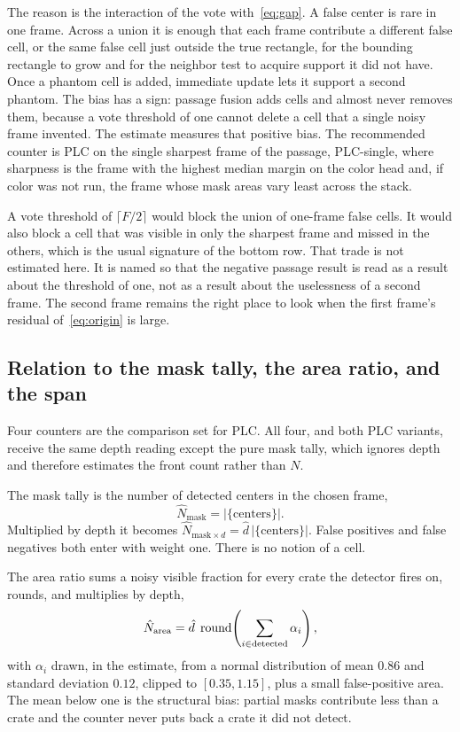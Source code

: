 The reason is the interaction of the vote with~\eqref{eq:gap}. A false center is rare in one frame. Across a union it is enough that each frame contribute a different false cell, or the same false cell just outside the true rectangle, for the bounding rectangle to grow and for the neighbor test to acquire support it did not have. Once a phantom cell is added, immediate update lets it support a second phantom. The bias has a sign: passage fusion adds cells and almost never removes them, because a vote threshold of one cannot delete a cell that a single noisy frame invented. The estimate measures that positive bias. The recommended counter is PLC on the single sharpest frame of the passage, PLC-single, where sharpness is the frame with the highest median margin on the color head and, if color was not run, the frame whose mask areas vary least across the stack.

A vote threshold of $\lceil F/2\rceil$ would block the union of one-frame false cells. It would also block a cell that was visible in only the sharpest frame and missed in the others, which is the usual signature of the bottom row. That trade is not estimated here. It is named so that the negative passage result is read as a result about the threshold of one, not as a result about the uselessness of a second frame. The second frame remains the right place to look when the first frame's residual of~\eqref{eq:origin} is large.

\subsection{Relation to the mask tally, the area ratio, and the span}
\label{sec:plc-baselines}

Four counters are the comparison set for PLC. All four, and both PLC variants, receive the same depth reading except the pure mask tally, which ignores depth and therefore estimates the front count rather than $N$.

The mask tally is the number of detected centers in the chosen frame,
\begin{equation}
\hat{N}_{\text{mask}} = \lvert\{\text{centers}\}\rvert.
\label{eq:mask-count}
\end{equation}
Multiplied by depth it becomes $\hat{N}_{\text{mask}\times d}=\hat{d}\,\lvert\{\text{centers}\}\rvert$. False positives and false negatives both enter with weight one. There is no notion of a cell.

The area ratio sums a noisy visible fraction for every crate the detector fires on, rounds, and multiplies by depth,
\begin{equation}
\hat{N}_{\text{area}}
= \hat{d}\;
\operatorname{round}\!\left(
\sum_{i\in\text{detected}} \alpha_i
\right),
\label{eq:area}
\end{equation}
with $\alpha_i$ drawn, in the estimate, from a normal distribution of mean $0.86$ and standard deviation $0.12$, clipped to $[0.35,1.15]$, plus a small false-positive area. The mean below one is the structural bias: partial masks contribute less than a crate and the counter never puts back a crate it did not detect.

